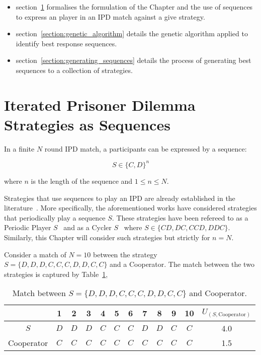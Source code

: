 \begin{itemize}
    \item section~\ref{section:ipd_as_sequences} formalises the formulation of
    the Chapter and the use of sequences to express an player in an IPD match
    against a give strategy.
    \item section~\ref{section:genetic_algorithm} details the genetic algorithm
    applied to identify best response
    sequences.
    \item section~\ref{section:generating_sequences} details the process of
    generating best sequences to a collection of
    \numberofstrategiesbestsequences strategies.
\end{itemize}

\section{Iterated Prisoner Dilemma Strategies as Sequences}\label{section:ipd_as_sequences}

In a finite \(N\) round IPD match, a participants can be expressed by a sequence:

\begin{equation}
    S \in \{C, D\} ^ n
\end{equation}

where \(n\) is the length of the sequence and \(1 \leq n \leq N\).

Strategies that use sequences to play an IPD are already established in the
literature~\cite{Beaufils1997, Knight2016, Li2011, Mittal2009}. More
specifically, the aforementioned works have considered strategies that
periodically play a sequence \(S\). These strategies have been refereed to as a
Periodic Player \(S\)~\cite{Li2011, Mittal2009} and as a Cycler
\(S\)~\cite{Knight2016} where \(S \in \{CD, DC, CCD, DDC\}\).
Similarly, this Chapter will consider such strategies but
strictly for \(n = N\).

Consider a match of \(N = 10\) between the strategy \(S = \{D, D, D, C, C, C, D,
D, C, C\}\) and a Cooperator. The match between the two strategies is captured
by Table~\ref{table:s_vs_cooperator},

\begin{table}[htb]
\centering
\begin{tabular}{cccccccccccc}
    & \textbf{1} & \textbf{2} & \textbf{3} & \textbf{4}  & \textbf{5} & \textbf{6} & \textbf{7} & \textbf{8}  & \textbf{9} & \textbf{10} & 
    \(U_{(S, \text{Cooperator})}\) \\ \midrule
    \(S\) & \(D\) & \(D\) & \(D\) & \(C\) & \(C\) & \(C\) & \(D\) & \(D\) & \(C\) & \(C\) & 4.0 \\
    Cooperator & \(C\) & \(C\) & \(C\) & \(C\) & \(C\) & \(C\) & \(C\) & \(C\) & \(C\) & \(C\) & 1.5 \\ \bottomrule
\end{tabular}
\caption{Match between \(S = \{D, D, D, C, C, C, D, D, C, C\}\) and Cooperator.}\label{table:s_vs_cooperator}
\end{table}

